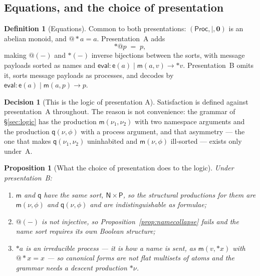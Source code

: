 \documentclass[11pt]{article}
\makeatletter
\theoremstyle{plain}
\newtheorem{proposition}[theorem]{Proposition}
\theoremstyle{definition}
\newtheorem{definition}[theorem]{Definition}
\newtheorem{decision}[theorem]{Decision}
\theoremstyle{remark}
\newcommand{\quo}[1]{@#1}
\newcommand{\drp}[1]{{*}#1}
\newcommand{\nil}{\mathbf{0}}
\newcommand{\mm}{\mathsf{m}}
\newcommand{\ev}{\mathsf{e}}
\newcommand{\qq}{\mathsf{q}}
\newcommand{\red}{\longrightarrow}
\makeatother
\begin{document}
\subsection{Equations, and the choice of presentation}
\label{sec:whichpres}

\begin{definition}[Equations]
\label{def:eqns}
Common to both presentations: $(\mathsf{Proc},\mid,\nil)$ is an abelian
monoid, and $\quo{\drp{a}} = a$. Presentation~A adds
\[
  \drp{\quo{p}} \;=\; p ,
\]
making $\quo{(-)}$ and $\drp{(-)}$ inverse bijections between the sorts, with
message payloads sorted as names and $\mathsf{eval} : \ev(a) \mid \mm(a,v)
\red \drp{v}$. Presentation~B omits it, sorts message payloads as processes,
and decodes by $\mathsf{eval} : \ev(a) \mid \mm(a,p) \red p$.
\end{definition}

\begin{decision}[This is the logic of presentation A]
\label{dec:presA}
Satisfaction is defined against presentation~A throughout. The reason is not
convenience: the grammar of \S\ref{sec:logic} has the production
$\mm(\nu_1,\nu_2)$ with two namespace arguments and the production
$\qq(\nu,\phi)$ with a process argument, and that asymmetry --- the one that
makes $\qq(\nu_1,\nu_2)$ uninhabited and $\mm(\nu,\phi)$ ill-sorted --- exists
only under~A.
\end{decision}

\begin{proposition}[What the choice of presentation does to the logic]
\label{prop:AvsB}
Under presentation~B:
\begin{enumerate}[label=(\roman*),leftmargin=2.2em,itemsep=2pt,topsep=3pt]
\item $\mm$ and $\qq$ have the same sort, $\mathsf{N} \times \mathsf{P}$, so
      the structural productions for them are $\mm(\nu,\phi)$ and
      $\qq(\nu,\phi)$ and are indistinguishable as formulae;
\item $\quo{(-)}$ is not injective, so Proposition~\ref{prop:namecollapse}
      fails and the name sort requires its own Boolean structure;
\item $\drp{a}$ is an irreducible process --- it is how a name is sent, as
      $\mm(v,\drp{x})$ with $\quo{\drp{x}} = x$ --- so canonical forms are not
      flat multisets of atoms and the grammar needs a descent production
      $\drp{\nu}$.
\end{enumerate}
\end{proposition}
\end{document}
